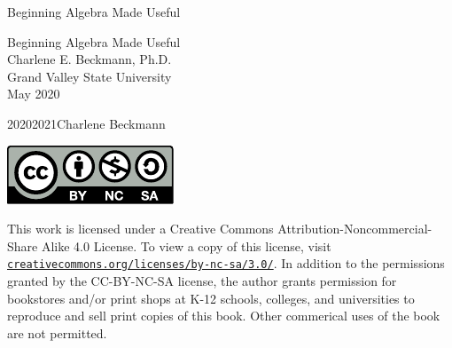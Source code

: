 \documentclass[oneside,10pt,]{book}
\newcommand{\titlepagefont}{\relax}
\numberwithin{equation}{chapter}
\begin{document}
\raggedbottom
\frontmatter
\thispagestyle{empty}
{\titlepagefont\centering
\vspace*{0.28\textheight}
{\Huge Beginning Algebra Made Useful}\\}
\clearpage
\thispagestyle{empty}
{\titlepagefont\centering
\vspace*{0.14\textheight}
{\Huge Beginning Algebra Made Useful}\\[3\baselineskip]
{\Large Charlene E. Beckmann, Ph.D.}\\[0.5\baselineskip]
{\Large Grand Valley State University}\\[3\baselineskip]
{\Large May 2020}\\}
\clearpage
\thispagestyle{empty}
\hypertarget{g:colophon:idp1871111384}{}
\noindent\textcopyright{}2020\textendash{}2021\quad{}Charlene Beckmann\\[0.5\baselineskip]
\begin{image}{0.425}{0.15}{0.425}%
\includegraphics[width=\linewidth]{external/license.pdf}
\end{image}%
 This work is licensed under a Creative Commons Attribution-Noncommercial-Share Alike 4.0 License. To view a copy of this license, visit \href{https://creativecommons.org/licenses/by-nc-sa/3.0/}{\nolinkurl{creativecommons.org/licenses/by-nc-sa/3.0/}}. In addition to the permissions granted by the CC-BY-NC-SA license, the author grants permission for bookstores and\slash{}or print shops at K-12 schools, colleges, and universities to reproduce and sell print copies of this book. Other commerical uses of the book are not permitted.\par\medskip
{}
\end{document}
